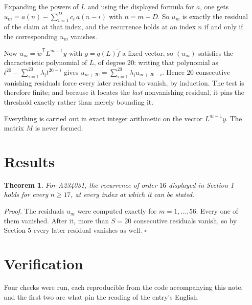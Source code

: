 \documentclass[11pt]{article}
\newtheorem{theorem}{Theorem}
\theoremstyle{definition}
\begin{document}
Expanding the powers of $L$ and using the displayed formula for $a$, one gets $u_m = a(n) - \sum_{i=1}^{D} c_i\,a(n-i)$ with $n = m + D$. So $u_m$ is exactly the residual of the claim at that index, and the recurrence holds at an index $n$ if and only if the corresponding $u_m$ vanishes.

Now $u_m = \tilde w^{\mathsf T} L^{m-1} y$ with $y = q(L)\tilde f$ a fixed vector, so $(u_m)$ satisfies the characteristic polynomial of $L$, of degree $20$: writing that polynomial as $t^{20} - \sum_{i=1}^{20} \lambda_i t^{20-i}$ gives $u_{m+20} = \sum_{i=1}^{20} \lambda_i u_{m+20-i}$. Hence $20$ consecutive vanishing residuals force every later residual to vanish, by induction. The test is therefore finite; and because it locates the {\itshape last} nonvanishing residual, it pins the threshold exactly rather than merely bounding it.

Everything is carried out in exact integer arithmetic on the vector $L^{m-1}y$. The matrix $M$ is never formed.

\section{Results}

\begin{theorem} For A234031, the recurrence of order $16$ displayed in Section 1 holds for every $n \ge 17$, at every index at which it can be stated.\end{theorem}

{\itshape Proof.} The residuals $u_m$ were computed exactly for $m = 1,\dots,56$. Every one of them vanished. After it, more than $S = 20$ consecutive residuals vanish, so by Section 5 every later residual vanishes as well. $\square$

\section{Verification}

Four checks were run, each reproducible from the code accompanying this note, and the first two are what pin the reading of the entry's English.
\end{document}
